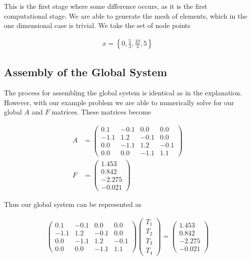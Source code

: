 \documentclass[10pt]{amsart}
\numberwithin{equation}{section}
\theoremstyle{definition}
\begin{document}
\begin{multicols}{2}
This is the first stage where some difference occurs, as it is the first
computational stage. We are able to generate the mesh of elements, which in the
one dimensional case is trivial. We take the set of node points

\begin{align*}
  x = \left\{0, \frac{5}{3}, \frac{10}{3}, 5\right\}
\end{align*}

\subsection{Assembly of the Global System}%
\label{sub:assembly_of_the_global_system}

The process for assembling the global system is identical as in the
explanation. However, with our example problem we are able to numerically solve
for our global $A$ and $F$ matrices. These matrices become

\begin{align*}
  A&=\begin{pmatrix}
    0.1 & -0.1 & 0.0 & 0.0 \\
    -1.1 & 1.2 & -0.1 & 0.0 \\
    0.0 & -1.1 & 1.2 & -0.1 \\
    0.0  & 0.0 & -1.1 & 1.1
  \end{pmatrix}\\
  F&=\begin{pmatrix}
    1.453 \\ 0.842 \\ -2.275 \\ -0.021
  \end{pmatrix}
\end{align*}

Thus our global system can be represented as

\begin{align*}
  \begin{pmatrix}
    0.1 & -0.1 & 0.0 & 0.0 \\
    -1.1 & 1.2 & -0.1 & 0.0 \\
    0.0 & -1.1 & 1.2 & -0.1 \\
    0.0  & 0.0 & -1.1 & 1.1
  \end{pmatrix}
  \begin{pmatrix}
    T_1 \\ T_2 \\ T_3 \\ T_4
  \end{pmatrix}
  =
  \begin{pmatrix}
    1.453 \\ 0.842 \\ -2.275 \\ -0.021
  \end{pmatrix}
\end{align*}


\end{multicols}
\end{document}
